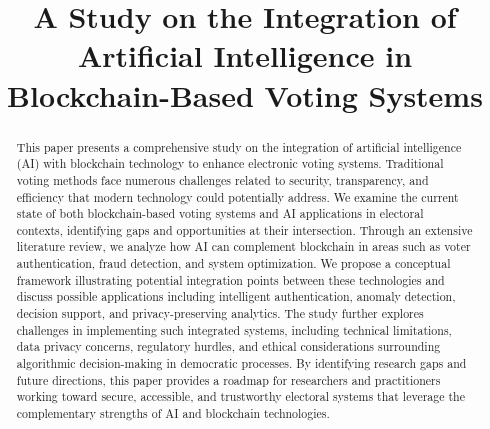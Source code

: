\documentclass[conference]{IEEEtran}
\begin{document}
\title{A Study on the Integration of Artificial Intelligence in Blockchain-Based Voting Systems\\}

\author{
    \and
    \and
}



\maketitle

\begin{abstract}
This paper presents a comprehensive study on the integration of artificial intelligence (AI) with blockchain technology to enhance electronic voting systems. Traditional voting methods face numerous challenges related to security, transparency, and efficiency that modern technology could potentially address. We examine the current state of both blockchain-based voting systems and AI applications in electoral contexts, identifying gaps and opportunities at their intersection. Through an extensive literature review, we analyze how AI can complement blockchain in areas such as voter authentication, fraud detection, and system optimization. We propose a conceptual framework illustrating potential integration points between these technologies and discuss possible applications including intelligent authentication, anomaly detection, decision support, and privacy-preserving analytics. The study further explores challenges in implementing such integrated systems, including technical limitations, data privacy concerns, regulatory hurdles, and ethical considerations surrounding algorithmic decision-making in democratic processes. By identifying research gaps and future directions, this paper provides a roadmap for researchers and practitioners working toward secure, accessible, and trustworthy electoral systems that leverage the complementary strengths of AI and blockchain technologies.
\end{abstract}
\end{document}
